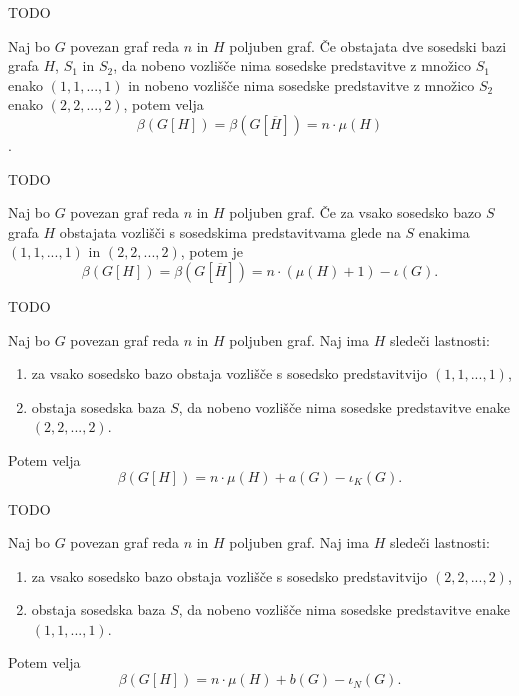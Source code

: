 \documentclass[mat1, tisk]{fmfdelo}
\newcommand{\1}{(1, 1, ..., 1)}
\newcommand{\2}{(2, 2, ..., 2)}
\begin{document}
\begin{dokaz}
    TODO
\end{dokaz}


\begin{trditev}
    Naj bo $G$ povezan graf reda $n$ in $H$ poljuben graf. Če obstajata dve sosedski bazi 
    grafa $H$, $S_1$ in $S_2$, da nobeno vozlišče nima sosedske predstavitve z množico $S_1$ 
    enako $\1$ in nobeno vozlišče nima sosedske predstavitve z množico $S_2$ 
    enako $\2$, potem velja $$\beta(G[H]) = \beta(G[\overline{H}]) = n \cdot \mu(H) $$.
\end{trditev}

\begin{dokaz}
    TODO
\end{dokaz}


\begin{trditev}
    Naj bo $G$ povezan graf reda $n$ in $H$ poljuben graf. Če za vsako sosedsko bazo $S$
    grafa $H$ obstajata vozlišči s sosedskima predstavitvama glede na $S$ enakima $\1$ in $\2$,
    potem je 
    $$\beta(G[H]) = \beta(G[\overline{H}]) = n \cdot (\mu(H) + 1) - \iota(G). $$
\end{trditev}

\begin{dokaz}
    TODO
\end{dokaz}


\begin{trditev}
    Naj bo $G$ povezan graf reda $n$ in $H$ poljuben graf. Naj ima $H$ sledeči lastnosti:
    \begin{enumerate}
        \item za vsako sosedsko bazo obstaja vozlišče s sosedsko predstavitvijo $\1$,
        \item obstaja sosedska baza $S$, da nobeno vozlišče nima sosedske predstavitve enake $\2.$
    \end{enumerate} 
    Potem velja $$\beta(G[H]) = n \cdot \mu(H) + a(G) - \iota_K(G). $$
\end{trditev}

\begin{dokaz}
    TODO
\end{dokaz}


\begin{trditev}
    Naj bo $G$ povezan graf reda $n$ in $H$ poljuben graf. Naj ima $H$ sledeči lastnosti:
    \begin{enumerate}
        \item za vsako sosedsko bazo obstaja vozlišče s sosedsko predstavitvijo $\2$,
        \item obstaja sosedska baza $S$, da nobeno vozlišče nima sosedske predstavitve enake $\1.$
    \end{enumerate} 
    Potem velja $$\beta(G[H]) = n \cdot \mu(H) + b(G) - \iota_N(G). $$
\end{trditev}
\end{document}
